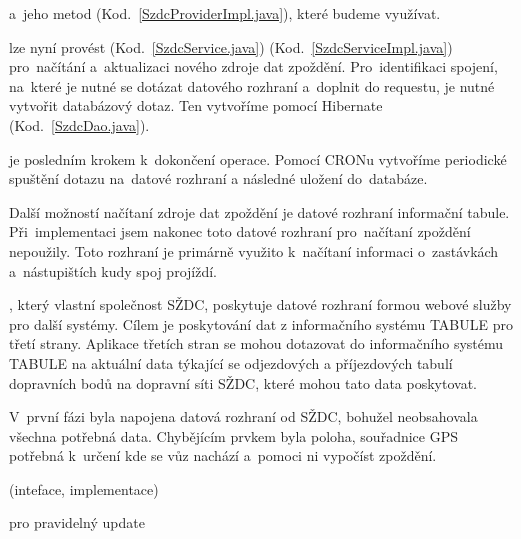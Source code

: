
 a~jeho metod (Kod.~\ref{SzdcProviderImpl.java}), které budeme využívat.


 lze nyní provést (Kod.~\ref{SzdcService.java}) (Kod.~\ref{SzdcServiceImpl.java}) pro~načítání a~aktualizaci nového zdroje dat zpoždění. Pro~identifikaci spojení, na~které je nutné se dotázat datového rozhraní a~doplnit do requestu, je nutné vytvořit databázový dotaz. Ten vytvoříme pomocí Hibernate (Kod.~\ref{SzdcDao.java}).


 je posledním krokem k~dokončení operace. Pomocí CRONu vytvoříme periodické spuštění dotazu na~datové rozhraní a následné uložení do~databáze.



Další možností načítaní zdroje dat zpoždění je datové rozhraní informační tabule. Při~implementaci jsem nakonec toto datové rozhraní pro~načítaní zpoždění nepoužily. Toto rozhraní je primárně  využito k~načítaní informaci o~zastávkách a~nástupištích kudy spoj projíždí.

, který vlastní společnost SŽDC, poskytuje datové rozhraní formou webové služby pro další systémy. Cílem je poskytování dat z informačního systému TABULE pro třetí strany. Aplikace třetích stran se mohou dotazovat do informačního systému TABULE na aktuální data týkající se odjezdových a příjezdových tabulí dopravních bodů na dopravní síti SŽDC, které mohou tato data poskytovat.

V~první fázi byla napojena datová rozhraní od SŽDC, bohužel neobsahovala všechna potřebná data. Chybějícím prvkem byla poloha, souřadnice GPS potřebná k~určení kde se vůz nachází a~pomoci ni vypočíst zpoždění.

 (inteface, implementace)
	
	
 pro pravidelný update


